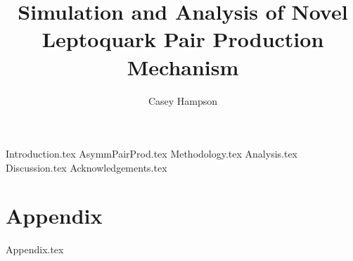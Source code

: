 \documentclass[titlepage]{article}
\title{Simulation and Analysis of Novel Leptoquark Pair Production Mechanism}
\author{Casey Hampson}
\begin{document}
    \maketitle
    \tableofcontents
    \pagebreak

    
    {Introduction.tex}
    {AsymmPairProd.tex}
    {Methodology.tex}
    {Analysis.tex}
    {Discussion.tex}
    {Acknowledgements.tex}


    \pagebreak
    \part*{Appendix}
    \appendix
    {Appendix.tex}

    \pagebreak
    
    
    
\end{document}
